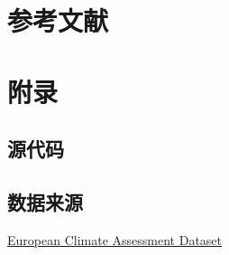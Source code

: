\documentclass[UTF8]{ctexart}
\begin{document}
  \section{参考文献}


  \appendix
  \setcounter{secnumdepth}{-2} 
  \section{附录}

  \setcounter{secnumdepth}{3} 
  \subsection{源代码}
  
  \subsection{数据来源}
  
  \href{https://www.ecad.eu/}{European Climate Assessment  Dataset}
\end{document}
